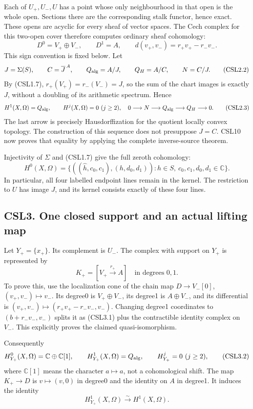 Each of \(U_+,U_-,U\) has a point whose only neighbourhood in that open
is the whole open. Sections there are the corresponding stalk functor,
hence exact. These opens are acyclic for every sheaf of vector spaces.
The Cech complex for this two-open cover therefore computes ordinary
sheaf cohomology: \[
D^0=V_+\oplus V_-,\qquad D^1=A,\qquad
d(v_+,v_-)=r_+v_+-r_-v_-.
\tag{CSL2.1}
\] This sign convention is fixed below. Let \[
J=\Sigma(S),\qquad C=\overline J^{\,A},\qquad
Q_{\rm alg}=A/J,\qquad Q_H=A/C,\qquad N=C/J.
\tag{CSL2.2}
\] By (CSL1.7), \(r_+(V_+)=r_-(V_-)=J\), so the sum of the chart images
is exactly \(J\), without a doubling of its arithmetic spectrum. Hence
\[
H^1(X,\Omega)=Q_{\rm alg},\qquad H^j(X,\Omega)=0\ (j\ge2),
\quad 0\longrightarrow N\longrightarrow Q_{\rm alg}
\longrightarrow Q_H\longrightarrow0.
\tag{CSL2.3}
\] The last arrow is precisely Hausdorffization for the quotient locally
convex topology. The construction of this sequence does not presuppose
\(J=C\). CSL10 now proves that equality by applying the complete
inverse-source theorem.

Injectivity of \(\Sigma\) and (CSL1.7) give the full zeroth cohomology:
\[
H^0(X,\Omega)=
\{((\widehat h,c_0,c_1),(h,d_0,d_1)):
h\in S,\ c_0,c_1,d_0,d_1\in\mathbb C\}.
\tag{CSL2.4}
\] In particular, all four labelled endpoint lines remain in the kernel.
The restriction to \(U\) has image \(J\), and its kernel consists
exactly of these four lines.

\subsection{CSL3. One closed support and an actual lifting
map}\label{csl3.-one-closed-support-and-an-actual-lifting-map}

Let \(Y_+=\{x_+\}\). Its complement is \(U_-\). The complex with support
on \(Y_+\) is represented by \[
K_+=[V_+\xrightarrow{r_+}A]
\quad\text{in degrees }0,1.
\tag{CSL3.1}
\] To prove this, use the localization cone of the chain map
\(D\to V_-[0]\), \((v_+,v_-)\mapsto v_-\). Its degree0 is
\(V_+\oplus V_-\), its degree1 is \(A\oplus V_-\), and its differential
is \((v_+,v_-)\mapsto(r_+v_+-r_-v_-,v_-)\). Changing degree1 coordinates
to \((b+r_-v_-,v_-)\) splits it as (CSL3.1) plus the contractible
identity complex on \(V_-\). This explicitly proves the claimed
quasi-isomorphism.

Consequently \[
H^0_{Y_+}(X,\Omega)=\mathbb C\oplus\mathbb C[1],\qquad
H^1_{Y_+}(X,\Omega)=Q_{\rm alg},\qquad H^j_{Y_+}=0\ (j\ge2),
\tag{CSL3.2}
\] where \(\mathbb C[1]\) means the character \(a\mapsto a\), not a
cohomological shift. The map \(K_+\to D\) is \(v\mapsto(v,0)\) in
degree0 and the identity on \(A\) in degree1. It induces the identity \[
H^1_{Y_+}(X,\Omega)\xrightarrow{\sim}H^1(X,\Omega).
\tag{CSL3.3}
\]

